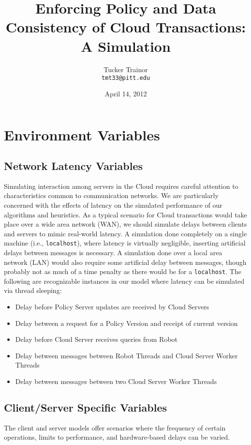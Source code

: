 \documentclass[11pt]{article}
\title{Enforcing Policy and Data Consistency of Cloud Transactions: A Simulation}
\author{Tucker Trainor\\\texttt{tmt33@pitt.edu}}
\date{April 14, 2012} %
\begin{document}
\maketitle
\section{Environment Variables}
\subsection{Network Latency Variables}
Simulating interaction among servers in the Cloud requires careful attention to characteristics common to communication networks. We are particularly concerned with the effects of latency on the simulated performance of our algorithms and heuristics. As a typical scenario for Cloud transactions would take place over a wide area network (WAN), we should simulate delays between clients and servers to mimic real-world latency. A simulation done completely on a single machine (i.e., \texttt{localhost}), where latency is virtually negligible, inserting artificial delays between messages is necessary. A simulation done over a local area network (LAN) would also require some artificial delay between messages, though probably not as much of a time penalty as there would be for a \texttt{localhost}. The following are recognizable instances in our model where latency can be simulated via thread sleeping:
\begin{itemize}
\item{}Delay before Policy Server updates are received by Cloud Servers
\item{}Delay between a request for a Policy Version and receipt of current version
\item{}Delay before Cloud Server receives queries from Robot
\item{}Delay between messages between Robot Threads and Cloud Server Worker Threads
\item{}Delay between messages between two Cloud Server Worker Threads
\end{itemize}
\subsection{Client/Server Specific Variables}
The client and server models offer scenarios where the frequency of certain operations, limits to performance, and hardware-based delays can be varied.
\end{document}
